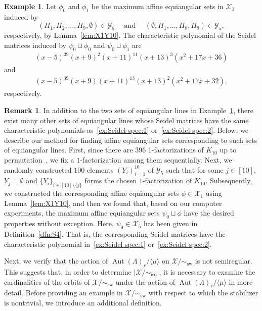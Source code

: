 \documentclass[reqno, 11pt]{amsart}
\numberwithin{equation}{section}
\theoremstyle{definition}
\newtheorem{remark}[lem]{Remark}%
\newtheorem{example}[lem]{Example}%
\DeclareMathOperator{\Aut}{Aut}
\DeclareMathOperator{\sw}{sw}
\DeclareMathOperator{\iso}{iso}
\newcommand{\cY}{\mathcal{Y}}
\newcommand{\aeso}{\phi}
\newcommand{\aesf}{\psi}
\newcommand{\cX}{\mathcal{X}}
\newcommand{\sr}{ r } %
\begin{document}
\begin{example}	\label{ex:Seidel spec}
	Let $\aeso_0$ and $\aeso_1$ be the maximum affine equiangular sets in $\cX_1$ induced by 
	$$(H_1, H_2, \ldots,H_9,\emptyset) \in \cY_5 \quad \text{ and } \quad (\emptyset, H_1, \ldots,H_8, H_9) \in \cY_5,$$
	respectively, by Lemma~\ref{lem:X1Y10}.
	The characteristic polynomial of the Seidel matrices induced by $\aesf_0 \sqcup \aeso_0$ and $\aesf_0 \sqcup  \aeso_1$ are
	\begin{align}	\label{ex:Seidel spec:1}
		(x-5)^{39}(x+9)^2(x+11)^{11}(x+13)^3(x^2+17x+36)
	\end{align}
	and 
	\begin{align}	\label{ex:Seidel spec:2}
		(x-5)^{39}(x+9)(x+11)^{13}(x+13)^2(x^2+17x+32),
	\end{align}
	respectively.	
\end{example}

\begin{remark}
In addition to the two sets of equiangular lines in Example~\ref{ex:Seidel spec}, there exist many other sets of equiangular lines whose Seidel matrices have the same characteristic polynomials as~\eqref{ex:Seidel spec:1} or~\eqref{ex:Seidel spec:2}.  
Below, we describe our method for finding affine equiangular sets corresponding to such sets of equiangular lines.  
First, since there are $396$ 1-factorizations of $K_{10}$ up to permutation~\cite[5.26]{handbook}, we fix a $1$-factorization among them sequentially.
Next, we randomly constructed $100$ elements $(Y_i)_{i=1}^{10}$ of $\cY_5$ such that for some $j \in [10]$, $Y_j = \emptyset$ and $\{ Y_i \}_{i \in [10] \setminus \{j\}}$ forms the chosen $1$-factorization of $K_{10}$.  
Subsequently, we constructed the corresponding affine equiangular sets $\aeso \in \cX_1$ using Lemma~\ref{lem:X1Y10},  
and then we found that, based on our computer experiments, the maximum affine equiangular sets $\aesf_0 \sqcup \aeso$ have the desired properties without exception.
Here, $\aesf_0 \in \cX_5$ has been given in Definition~\ref{dfn:S4}.
That is, the corresponding Seidel matrices have the characteristic polynomial in~\eqref{ex:Seidel spec:1} or~\eqref{ex:Seidel spec:2}.
\end{remark}

Next, we verify that the action of $\Aut(\Lambda)_{\sr}/\langle \mu \rangle$ on $\cX/\sim_{\sw}$ is not semiregular.  
This suggests that, in order to determine $|\cX/\sim_{\iso}|$, it is necessary to examine the cardinalities of the orbits of $\cX/\sim_{\sw}$ under the action of $\Aut(\Lambda)_{\sr}/\langle \mu \rangle$ in more detail.  
Before providing an example in $\cX/\sim_{\sw}$ with respect to which the stabilizer is nontrivial, we introduce an additional definition.
\end{document}
